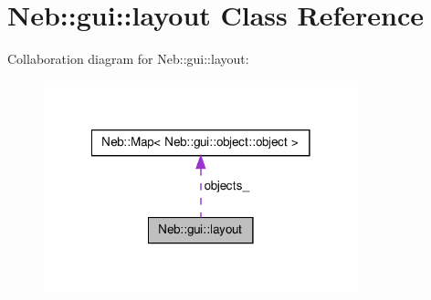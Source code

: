 \hypertarget{classNeb_1_1gui_1_1layout}{\section{\-Neb\-:\-:gui\-:\-:layout \-Class \-Reference}
\label{classNeb_1_1gui_1_1layout}
}


\-Collaboration diagram for \-Neb\-:\-:gui\-:\-:layout\-:\nopagebreak
\begin{figure}[H]
\begin{center}
\leavevmode
\includegraphics[width=258pt]{classNeb_1_1gui_1_1layout__coll__graph}
\end{center}
\end{figure}
